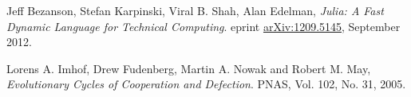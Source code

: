 \documentclass[a4paper,12pt]{article}
\begin{document}
\begin{thebibliography}{9}

        Jeff Bezanson, Stefan Karpinski, Viral B. Shah, Alan Edelman,
        \emph{Julia: A Fast Dynamic Language for Technical Computing}.
        eprint \href{http://arxiv.org/pdf/1209.5145v1.pdf}{arXiv:1209.5145},
        September 2012.

        Lorens A. Imhof, Drew Fudenberg, Martin A. Nowak and Robert M. May,
        \emph{Evolutionary Cycles of Cooperation and Defection}.
        PNAS,
        Vol. 102,
        No. 31, 
        2005.

\end{thebibliography}
\end{document}
